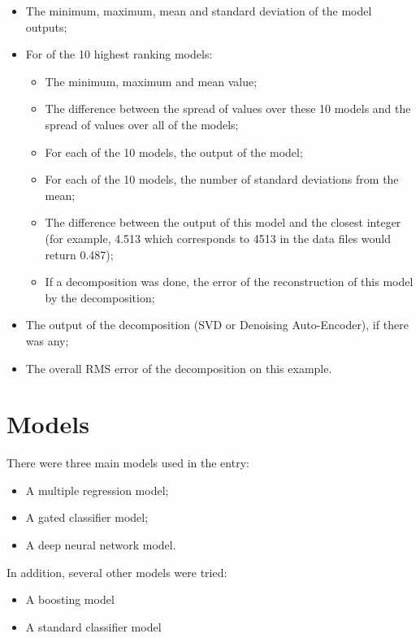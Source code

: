 \documentclass{article}
\begin{document}
\begin{itemize}
\item The minimum, maximum, mean and standard deviation of the model outputs;
\item For of the 10 highest ranking models:
  \begin{itemize}
    \item The minimum, maximum and mean value;
    \item The difference between the spread of values over these 10 models and the spread of values over all of the models;
    \item For each of the 10 models, the output of the model;
    \item For each of the 10 models, the number of standard deviations from the mean;
    \item The difference between the output of this model and the closest integer (for example, 4.513 which corresponds to 4513 in the data files would return 0.487);
    \item If a decomposition was done, the error of the reconstruction of this model by the decomposition;
  \end{itemize}
\item The output of the decomposition (SVD or Denoising Auto-Encoder), if there was any;
\item The overall RMS error of the decomposition on this example.

\end{itemize}


\section{Models}

There were three main models used in the entry:

\begin{itemize}
\item A multiple regression model;
\item A gated classifier model;
\item A deep neural network model.
\end{itemize}

In addition, several other models were tried:

\begin{itemize}
\item A boosting model
\item A standard classifier model
\end{itemize}
\end{document}
